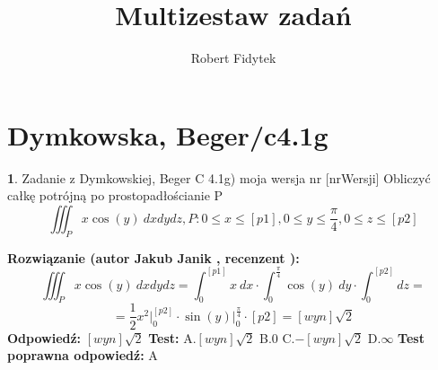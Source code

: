 \documentclass[12pt, a4paper]{article}
\title{Multizestaw zadań}
\author{Robert Fidytek}
\date{}
\theoremstyle{definition} %
\newtheorem{zad}{}
\newcommand{\kategoria}[1]{\section{#1}} %
\newcommand{\zadStart}[1]{\begin{zad}#1\newline} %
\newcommand{\zadStop}{\end{zad}}   %
\newcommand{\rozwStart}[2]{\noindent \textbf{Rozwiązanie (autor #1 , recenzent #2): }\newline} %
\newcommand{\rozwStop}{\newline}                                            %
\newcommand{\odpStart}{\noindent \textbf{Odpowiedź:}\newline}    %
\newcommand{\odpStop}{\newline}                                             %
\newcommand{\testStart}{\noindent \textbf{Test:}\newline} %
\newcommand{\testStop}{\newline} %
\newcommand{\kluczStart}{\noindent \textbf{Test poprawna odpowiedź:}\newline} %
\newcommand{\kluczStop}{\newline} %
\begin{document}
\maketitle


\kategoria{Dymkowska, Beger/c4.1g}
\zadStart{Zadanie z Dymkowskiej, Beger C 4.1g) moja wersja nr [nrWersji]}
Obliczyć całkę potrójną po prostopadłościanie P $$\iiint_P x\cos{(y)}\ dxdydz, P: 0 \leq x \leq [p1], 0 \leq y \leq \frac{\pi}{4}, 0 \leq z \leq [p2]$$
\zadStop
\rozwStart{Jakub Janik}{}
$$\iiint_P x\cos{(y)}\ dxdydz=\int_0^{[p1]}x\ dx\cdot\int_0^{\frac{\pi}{4}}\cos{(y)}\ dy\cdot\int_0^{[p2]}dz=$$
$$=\frac{1}{2}x^2\Big|_0^{[p2]}\cdot \sin{(y)}\Big|_0^{\frac{\pi}{4}}\cdot [p2]=[wyn]\sqrt{2}$$
\rozwStop
\odpStart
$[wyn]\sqrt{2}$
\odpStop
\testStart
A.$[wyn]\sqrt{2}$
B.$0$
C.$-[wyn]\sqrt{2}$
D.$\infty$
\testStop
\kluczStart
A
\kluczStop
\end{document}
